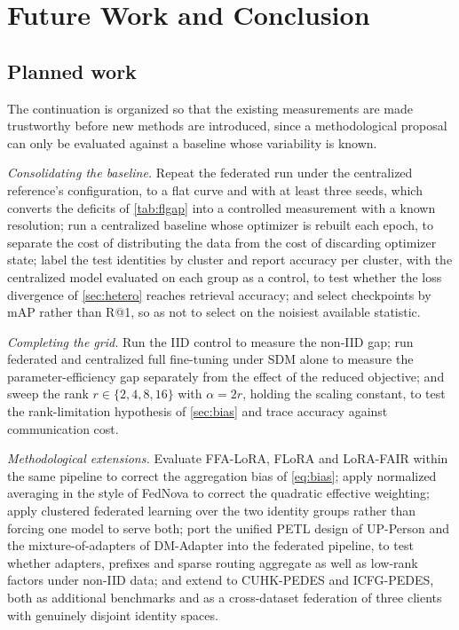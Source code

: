 \section{Future Work and Conclusion}\label{sec:next}

\subsection{Planned work}

The continuation is organized so that the existing measurements are made trustworthy before new methods are introduced, since a methodological proposal can only be evaluated against a baseline whose variability is known.

\emph{Consolidating the baseline.} Repeat the federated run under the centralized reference's configuration, to a flat curve and with at least three seeds, which converts the deficits of \cref{tab:flgap} into a controlled measurement with a known resolution; run a centralized baseline whose optimizer is rebuilt each epoch, to separate the cost of distributing the data from the cost of discarding optimizer state; label the test identities by cluster and report accuracy per cluster, with the centralized model evaluated on each group as a control, to test whether the loss divergence of \cref{sec:hetero} reaches retrieval accuracy; and select checkpoints by mAP rather than R@1, so as not to select on the noisiest available statistic.

\emph{Completing the grid.} Run the IID control to measure the non-IID gap; run federated and centralized full fine-tuning under SDM alone to measure the parameter-efficiency gap separately from the effect of the reduced objective; and sweep the rank $r\in\{2,4,8,16\}$ with $\alpha=2r$, holding the scaling constant, to test the rank-limitation hypothesis of \cref{sec:bias} and trace accuracy against communication cost.

\emph{Methodological extensions.} Evaluate FFA-LoRA, FLoRA and LoRA-FAIR within the same pipeline to correct the aggregation bias of \cref{eq:bias}; apply normalized averaging in the style of FedNova to correct the quadratic effective weighting; apply clustered federated learning over the two identity groups rather than forcing one model to serve both; port the unified PETL design of UP-Person and the mixture-of-adapters of DM-Adapter into the federated pipeline, to test whether adapters, prefixes and sparse routing aggregate as well as low-rank factors under non-IID data; and extend to CUHK-PEDES and ICFG-PEDES, both as additional benchmarks and as a cross-dataset federation of three clients with genuinely disjoint identity spaces.

